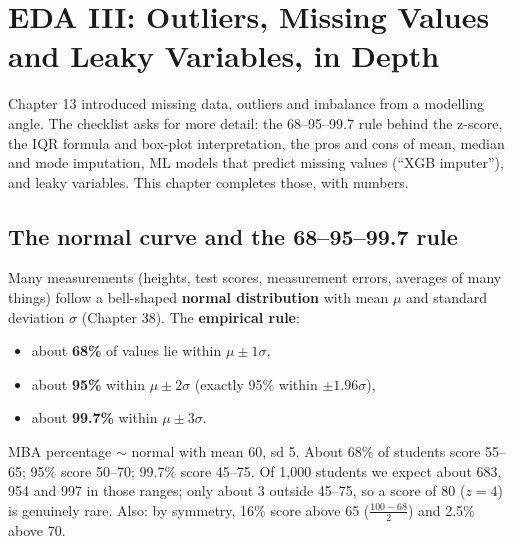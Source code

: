 \chapter{EDA III: Outliers, Missing Values and Leaky Variables, in Depth}

Chapter 13 introduced missing data, outliers and imbalance from a modelling angle. The checklist asks for more detail: the 68--95--99.7 rule behind the
z-score, the IQR formula and box-plot interpretation, the pros and cons of mean, median and mode imputation, ML models that predict missing values (``XGB
imputer''), and leaky variables. This chapter completes those, with numbers.

\section{The normal curve and the 68--95--99.7 rule}
Many measurements (heights, test scores, measurement errors, averages of many things) follow a bell-shaped \textbf{normal distribution} with mean $\mu$ and
standard deviation $\sigma$ (Chapter 38). The \textbf{empirical rule}:
\begin{itemize}
\item about \textbf{68\%} of values lie within $\mu\pm1\sigma$,
\item about \textbf{95\%} within $\mu\pm2\sigma$ (exactly 95\% within $\pm1.96\sigma$),
\item about \textbf{99.7\%} within $\mu\pm3\sigma$.
\end{itemize}
\begin{center}
\end{center}
\begin{example}
MBA percentage $\sim$ normal with mean 60, sd 5. About 68\% of students score 55--65; 95\% score 50--70; 99.7\% score 45--75. Of 1{,}000 students we expect
about 683, 954 and 997 in those ranges; only about 3 outside 45--75, so a score of 80 ($z = 4$) is genuinely rare. Also: by symmetry, 16\% score above 65
($\frac{100 - 68}{2}$) and 2.5\% above 70.
\end{example}

